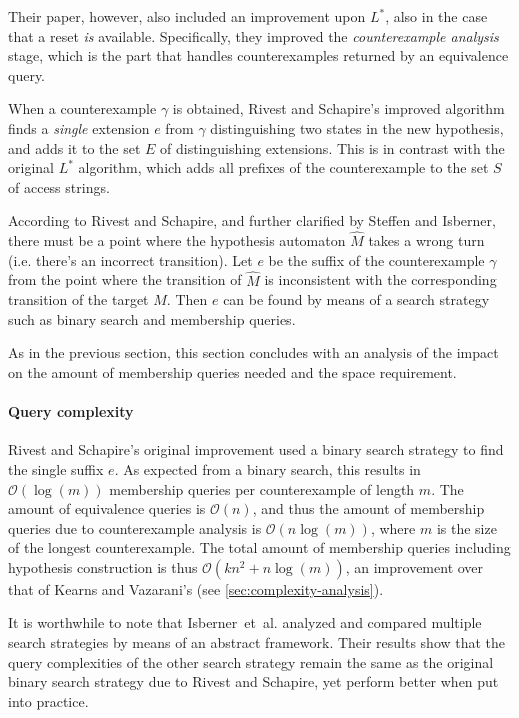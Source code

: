 \documentclass[multi,crop=false,class=article]{standalone}
\begin{document}
Their paper, however, also included an improvement upon $L^*$, also in the case
that a reset \textit{is} available. Specifically, they improved the
\textit{counterexample analysis} stage, which is the part that handles
counterexamples returned by an equivalence query.

When a counterexample $\gamma$ is obtained, Rivest and Schapire's improved
algorithm finds a \textit{single} extension $e$ from $\gamma$ distinguishing two
states in the new hypothesis, and adds it to the set $E$ of distinguishing
extensions. This is in contrast with the original $L^*$ algorithm, which adds
all prefixes of the counterexample to the set $S$ of access strings.

According to Rivest and Schapire\cite{Rivest93}, and further clarified by
Steffen\cite{Steffen11} and Isberner\cite{Isberner14a}, there must be a point
where the hypothesis automaton $\hat M$ takes a wrong turn (i.e. there's an
incorrect transition). Let $e$ be the suffix of the counterexample $\gamma$ from
the point where the transition of $\hat M$ is inconsistent with the
corresponding transition of the target $M$. Then $e$ can be found by means of a
search strategy such as binary search and membership queries.

As in the previous section, this section concludes with an analysis of the
impact on the amount of membership queries needed and the space requirement.

\paragraph{Query complexity} Rivest and Schapire's original improvement used a
binary search strategy to find the single suffix $e$. As expected from a binary
search, this results in $\mathcal{O}(\log(m))$ membership queries per
counterexample of length $m$. The amount of equivalence queries is
$\mathcal{O}(n)$, and thus the amount of membership queries due to
counterexample analysis is $\mathcal{O}(n\log(m))$, where $m$ is the size of the
longest counterexample. The total amount of membership queries including
hypothesis construction is thus $\mathcal{O}(kn^2 + n\log(m))$, an improvement
over that of Kearns and Vazarani's (see \cref{sec:complexity-analysis}).

It is worthwhile to note that Isberner~et~al. analyzed and compared multiple
search strategies by means of an abstract framework\cite{Isberner14a}. Their
results show that the query complexities of the other search strategy remain the
same as the original binary search strategy due to Rivest and Schapire, yet
perform better when put into practice.
\end{document}

